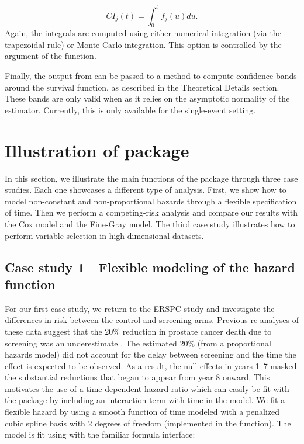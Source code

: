 \[ CI_j(t) = \int_0^t f_j(u)du.\] Again, the integrals are computed
using either numerical integration (via the trapezoidal rule) or Monte
Carlo integration. This option is controlled by the argument
 of the  function.

Finally, the output from  can be passed to a method
 to compute confidence bands around the survival function,
as described in the Theoretical Details section. These bands are only
valid when  as it relies on the asymptotic
normality of the estimator. Currently, this is only available for the
single-event setting.

\hypertarget{illustration-of-package}{%
\section{Illustration of package}\label{illustration-of-package}}

In this section, we illustrate the main functions of the 
package through three case studies. Each one showcases a different type
of analysis. First, we show how to model non-constant and
non-proportional hazards through a flexible specification of time. Then
we perform a competing-risk analysis and compare our results with the
Cox model and the Fine-Gray model. The third case study illustrates how
to perform variable selection in high-dimensional datasets.

\hypertarget{case-study-1flexible-modeling-of-the-hazard-function}{%
\subsection{Case study 1---Flexible modeling of the hazard
function}\label{case-study-1flexible-modeling-of-the-hazard-function}}

For our first case study, we return to the ERSPC study and investigate
the differences in risk between the control and screening arms. Previous
re-analyses of these data suggest that the 20\% reduction in prostate
cancer death due to screening was an underestimate
\citep{hanley2010mortality}. The estimated 20\% (from a proportional
hazards model) did not account for the delay between screening and the
time the effect is expected to be observed. As a result, the null
effects in years 1--7 masked the substantial reductions that began to
appear from year 8 onward. This motivates the use of a time-dependent
hazard ratio which can easily be fit with the  package by
including an interaction term with time in the model. We fit a flexible
hazard by using a smooth function of time modeled with a penalized cubic
spline basis with 2 degrees of freedom (implemented in the
 function). The model is fit using
 with the familiar formula interface:

